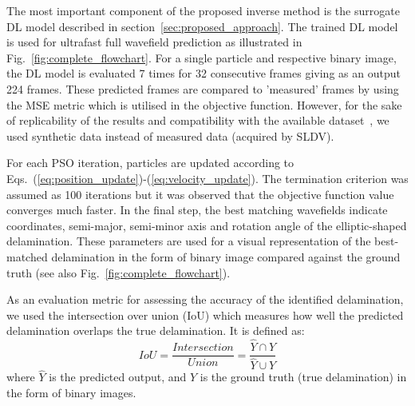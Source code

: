 The most important component of the proposed inverse method is the surrogate DL model described in section~\ref{sec:proposed_approach}.
The trained DL model is used for ultrafast full wavefield prediction as illustrated in Fig.~\ref{fig:complete_flowchart}.
For a single particle and respective binary image, the DL model is evaluated 7 times for 32 consecutive frames giving as an output 224 frames. 
These predicted frames are compared to 'measured' frames by using the MSE metric which is utilised in the objective function.
However, for the sake of replicability of the results and compatibility with the available dataset~\cite{kudela_pawel_2021_5414555}, we used synthetic data instead of measured data (acquired by SLDV).

For each PSO iteration, particles are updated according to Eqs.~(\ref{eq:position_update})-(\ref{eq:velocity_update}).
The termination criterion was assumed as 100 iterations but it was observed that the objective function value converges much faster.
In the final step, the best matching wavefields indicate coordinates, semi-major, semi-minor axis and rotation angle of the elliptic-shaped delamination. 
These parameters are used for a visual representation of the best-matched delamination in the form of binary image compared against the ground truth (see also Fig.~\ref{fig:complete_flowchart}).

As an evaluation metric for assessing the accuracy of the identified delamination, we used the intersection over union (IoU) which measures how well the predicted delamination overlaps the true delamination. 
It is defined as:
\begin{equation}
	IoU=\frac{Intersection}{Union}=\frac{\hat{Y} \cap Y}{\hat{Y} \cup Y}
	\label{eq:iou}
\end{equation}
where \(\hat{Y}\) is the predicted output, and \(Y\) is the ground truth (true delamination) in the form of binary images.
